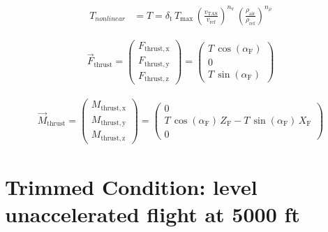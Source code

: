 \documentclass[lettersize,journal]{IEEEtran}
\begin{document}
{\begin{equation}
\begin{aligned}
T_{nonlinear}&=T=\delta _{\mathrm{t}}\,T_{\mathrm{max}}\,{\left(\frac{v_{\mathrm{TAS}}}{v_{\mathrm{ref}}}\right)}^{n_{\mathrm{v}}}\,{\left(\frac{\rho _{\mathrm{air}}}{\rho _{\mathrm{ref}}}\right)}^{n_{\rho }}
\end{aligned}
\end{equation}

\begin{equation}
\begin{aligned}
\overrightarrow{F}_{\mathrm{thrust}}=\left(\begin{array}{c} F_{\mathrm{thrust,x}}\\ F_{\mathrm{thrust,y}}\\ F_{\mathrm{thrust,z}} \end{array}\right)=\left(\begin{array}{c} T\,\cos\left(\alpha _{\mathrm{F}}\right)\\ 0\\ T\,\sin\left(\alpha _{\mathrm{F}}\right) \end{array}\right)
\end{aligned}
\end{equation}

\begin{equation}
\begin{aligned}
\overrightarrow{M}_{\mathrm{thrust}}=\left(\begin{array}{c} M_{\mathrm{thrust,x}}\\ M_{\mathrm{thrust,y}}\\ M_{\mathrm{thrust,z}} \end{array}\right)=\left(\begin{array}{c} 0\\ T\,\cos\left(\alpha _{\mathrm{F}}\right)\,Z_{\mathrm{F}}-T\,\sin\left(\alpha _{\mathrm{F}}\right)\,X_{\mathrm{F}}\\ 0 \end{array}\right)
\end{aligned}
\end{equation}

\newpage

\section{Trimmed Condition: level unaccelerated flight at 5000 ft}\label{apdx:trim_cond}

}
\end{document}
